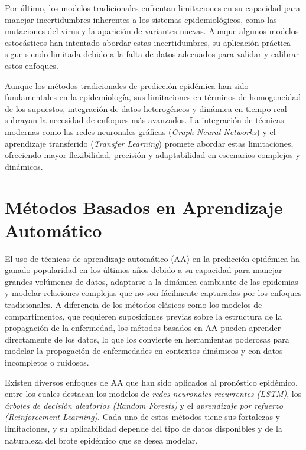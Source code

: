 Por último, los modelos tradicionales enfrentan limitaciones en su capacidad para manejar incertidumbres inherentes a los sistemas epidemiológicos, como las mutaciones del virus y la aparición de variantes nuevas. Aunque algunos modelos estocásticos han intentado abordar estas incertidumbres, su aplicación práctica sigue siendo limitada debido a la falta de datos adecuados para validar y calibrar estos enfoques\cite{Moein2021SIRInefficiency, Chowell2016EarlyGrowth}.

Aunque los métodos tradicionales de predicción epidémica han sido fundamentales en la epidemiología, sus limitaciones en términos de homogeneidad de los supuestos, integración de datos heterogéneos y dinámica en tiempo real subrayan la necesidad de enfoques más avanzados. La integración de técnicas modernas como las redes neuronales gráficas (\textit{Graph Neural Networks}) y el aprendizaje transferido (\textit{Transfer Learning}) promete abordar estas limitaciones, ofreciendo mayor flexibilidad, precisión y adaptabilidad en escenarios complejos y dinámicos.

\section{Métodos Basados en Aprendizaje Automático}\label{section:machine-learning-methods}

El uso de técnicas de aprendizaje automático (AA) en la predicción epidémica ha ganado popularidad en los últimos años debido a su capacidad para manejar grandes volúmenes de datos, adaptarse a la dinámica cambiante de las epidemias y modelar relaciones complejas que no son fácilmente capturadas por los enfoques tradicionales. A diferencia de los métodos clásicos como los modelos de compartimentos, que requieren suposiciones previas sobre la estructura de la propagación de la enfermedad, los métodos basados en AA pueden aprender directamente de los datos, lo que los convierte en herramientas poderosas para modelar la propagación de enfermedades en contextos dinámicos y con datos incompletos o ruidosos\parencite{Datilo2019EpidemicForecasting, Stergiou2022MachineLearning}.

Existen diversos enfoques de AA que han sido aplicados al pronóstico epidémico, entre los cuales destacan los modelos de \textit{redes neuronales recurrentes (LSTM)}, los \textit{árboles de decisión aleatorios (Random Forests)} y el \textit{aprendizaje por refuerzo (Reinforcement Learning)}\parencite{Rodriguez2022DataCentric}. Cada uno de estos métodos tiene sus fortalezas y limitaciones, y su aplicabilidad depende del tipo de datos disponibles y de la naturaleza del brote epidémico que se desea modelar.

